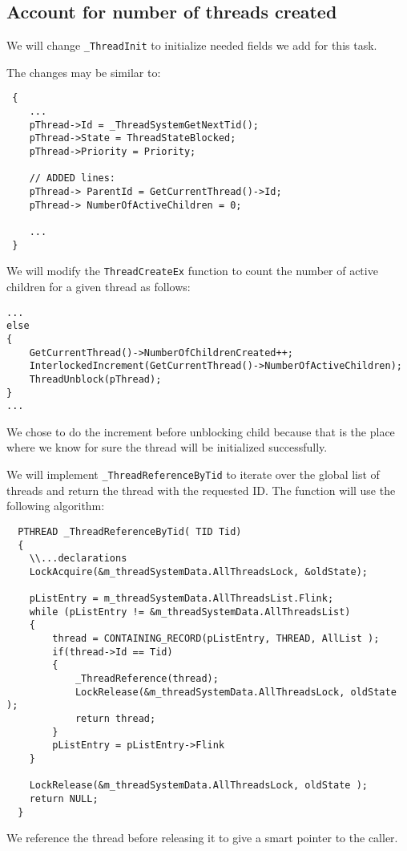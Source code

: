 \documentclass[a4paper,12pt]{report}
\begin{document}
\subsection{Account for number of threads created}

We will change \lstinline|_ThreadInit| to initialize needed fields we add for this task.

The changes may be similar to: 
\begin{lstlisting}
 {
    ...
    pThread->Id = _ThreadSystemGetNextTid();
    pThread->State = ThreadStateBlocked;
    pThread->Priority = Priority;
    
    // ADDED lines:
    pThread-> ParentId = GetCurrentThread()->Id;
    pThread-> NumberOfActiveChildren = 0;

    ...
 }
\end{lstlisting}

We will modify the \lstinline|ThreadCreateEx| function to count the number of active children for a given thread as follows:
\begin{lstlisting}
... 
else
{
    GetCurrentThread()->NumberOfChildrenCreated++; 
    InterlockedIncrement(GetCurrentThread()->NumberOfActiveChildren); 
    ThreadUnblock(pThread);
}
... 
\end{lstlisting}

 We chose to do the increment before unblocking child because that is the place where we know for sure the thread will be initialized successfully. 
 
 We will implement \lstinline|_ThreadReferenceByTid| to iterate over the global list of threads and return the thread with the requested ID. The function will use the following algorithm:
 
 \begin{lstlisting}
  PTHREAD _ThreadReferenceByTid( TID Tid)
  {
    \\...declarations
    LockAcquire(&m_threadSystemData.AllThreadsLock, &oldState);
   
    pListEntry = m_threadSystemData.AllThreadsList.Flink;
    while (pListEntry != &m_threadSystemData.AllThreadsList)
    {
        thread = CONTAINING_RECORD(pListEntry, THREAD, AllList );
        if(thread->Id == Tid)
        {
            _ThreadReference(thread);
            LockRelease(&m_threadSystemData.AllThreadsLock, oldState );
            return thread;
        }
        pListEntry = pListEntry->Flink
    }
   
    LockRelease(&m_threadSystemData.AllThreadsLock, oldState );
    return NULL;
  }
 \end{lstlisting}
 We reference the thread before releasing it to give a smart pointer to the caller.
 
\end{document}
